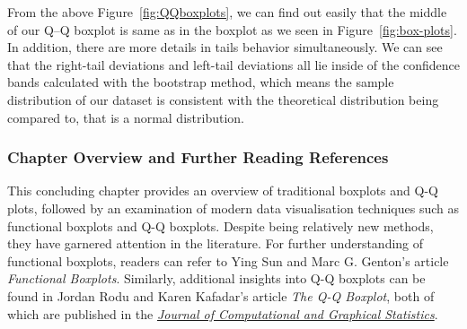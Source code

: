 \documentclass{article}\usepackage[]{graphicx}\usepackage[]{xcolor}
\numberwithin{equation}{section}
\begin{document}
\noindent
From the above Figure~\ref{fig:QQboxplots}, we can find out easily that the middle of our Q–Q boxplot is same as in the boxplot as we seen in Figure~\ref{fig:box-plots}. In addition, there are more details in tails behavior simultaneously. We can see that the right-tail deviations and left-tail deviations all lie inside of the confidence bands calculated with the bootstrap method, which means the sample distribution of our dataset is consistent with the theoretical distribution being compared to, that is a normal distribution.
\noindent

\subsubsection*{Chapter Overview and Further Reading References}

\noindent This concluding chapter provides an overview of traditional boxplots and Q-Q plots, followed by an examination of modern data visualisation techniques such as functional boxplots and Q-Q boxplots. Despite being relatively new methods, they have garnered attention in the literature. For further understanding of functional boxplots, readers can refer to Ying Sun and Marc G. Genton's article \textit{Functional Boxplots}. Similarly, additional insights into Q-Q boxplots can be found in Jordan Rodu and Karen Kafadar's article \textit{The Q-Q Boxplot}, both of which are published in the \href{https://www.tandfonline.com/journals/ucgs20}{\textit{Journal of Computational and Graphical Statistics}}.

\newpage  


\printindex
  

\newpage

\end{document}

